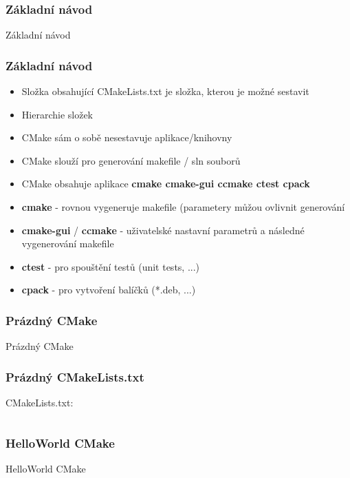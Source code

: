 \begin{frame}
\frametitle{Základní návod}
\begin{center}
\Huge {\color{white}Základní návod}
\end{center}
\end{frame}

\begin{frame}[fragile]
\frametitle{Základní návod}
	\begin{itemize}
	\item Složka obsahující CMakeLists.txt je složka, kterou je možné sestavit
  \item Hierarchie složek
  \item CMake sám o sobě nesestavuje aplikace/knihovny
  \item CMake slouží pro generování makefile / sln souborů
  \item CMake obsahuje aplikace \textbf{cmake cmake-gui ccmake ctest cpack}
  \item \textbf{cmake} - rovnou vygeneruje makefile (parametery můžou ovlivnit generování
  \item \textbf{cmake-gui} / \textbf{ccmake} - uživatelské nastavní parametrů a následné vygenerování makefile
  \item \textbf{ctest} - pro spouštění testů (unit tests, ...)
  \item \textbf{cpack} - pro vytvoření balíčků (*.deb, ...)
	\end{itemize}
\end{frame}

\begin{frame}
\frametitle{Prázdný CMake}
\begin{center}
\Huge {\color{white}Prázdný CMake}
\end{center}
\end{frame}

\begin{frame}[fragile]
\frametitle{Prázdný CMakeLists.txt}
CMakeLists.txt:
\inputminted[frame=lines]{cmake}{../examples/00-EmptyCMake/CMakeLists.txt}
\end{frame}

\begin{frame}
\frametitle{HelloWorld CMake}
\begin{center}
\Huge {\color{white}HelloWorld CMake}
\end{center}
\end{frame}


